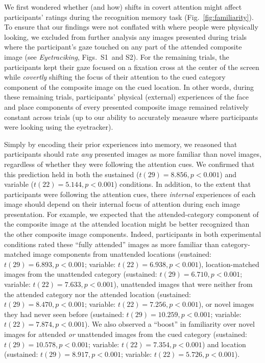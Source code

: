 \documentclass[english]{article}
\newcommand{\gazeLocations}{S1}
\newcommand{\excludedTrials}{S2}
\begin{document}
We first wondered whether (and how) shifts in covert attention might affect
participants' ratings during the recognition memory task
(Fig.~\ref{fig:familiarity}). To ensure that our findings were not conflated
with where people were physically looking, we excluded from further analysis
any images presented during trials where the participant's gaze touched on any
part of the attended composite image (see \textit{Eyetraciking},
Figs.~\gazeLocations~and \excludedTrials). For the remaining trials, the
participants kept their gaze focused on a fixation cross at the center of the
screen while \textit{covertly} shifting the focus of their attention to the
cued category component of the composite image on the cued location. In other
words, during these remaining trials, participants' physical (external)
experiences of the face and place components of every presented composite image
remained relatively constant across trials (up to our ability to accurately
measure where participants were looking using the eyetracker). 

Simply by encoding their prior experiences into memory, we reasoned that
participants should rate \textit{any} presented images as more familiar than
novel images, regardless of whether they were following the attention cues. We
confirmed that this prediction held in both the sustained ($t(29) = 8.856, p <
0.001$) and variable ($t(22) = 5.144, p < 0.001$) conditions. In addition, to
the extent that participants were following the attention cues, there
\textit{internal} experiences of each image should depend on their internal
focus of attention during each image presentation. For example, we expected
that the attended-category component of the composite image at the attended
location might be better recognized than the other composite image components.
Indeed, participants in both experimental conditions rated these ``fully
attended'' images as more familiar than category-matched image components from
unattended locations (sustained: $t(29) = 6.893, p < 0.001$; variable: $t(22) =
6.938, p < 0.001$), location-matched images from the unattended category
(sustained: $t(29) = 6.710, p < 0.001$; variable: $t(22) = 7.633, p < 0.001$),
unattended images that were neither from the attended category nor the attended
location (sustained: $t(29) = 8.470, p < 0.001$; variable: $t(22) = 7.256, p <
0.001$), or novel images they had never seen before (sustained: $t(29) =
10.259, p < 0.001$; variable: $t(22) = 7.874, p < 0.001$). We also observed a
``boost'' in familiarity over novel images for attended \textit{or} unattended
images from the cued category (sustained: $t(29) = 10.578, p < 0.001$;
variable: $t(22) = 7.354, p < 0.001$) and location (sustained: $t(29) = 8.917,
p < 0.001$; variable: $t(22) = 5.726, p < 0.001$).
\end{document}
